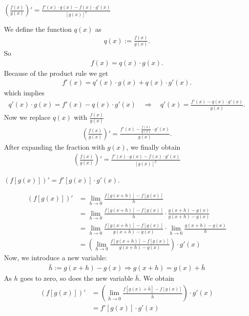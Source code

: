 \documentclass[12pt,eng]{skript_ogg}
\begin{document}
\begin{satz}$\left(\frac{f(x)}{g(x)}\right)'=\frac{f'(x)\cdot g(x)-f(x)\cdot g'(x)}{[g(x)]^2}$
\end{satz}
\begin{beweis}
We define the function $q(x)$ as
\begin{align*}
q(x):=\frac{f(x)}{g(x)}.
\end{align*}
So
\begin{align*}
f(x)=q(x)\cdot g(x).
\end{align*}
Because of the product rule we get
\begin{align*}
f'(x)=q'(x)\cdot g(x)+q(x)\cdot g'(x).
\end{align*}
which implies
\begin{align*}
q'(x)\cdot g(x)=f'(x)-q(x)\cdot g'(x)\quad\Rightarrow\quad q'(x)=\frac{f'(x)-q(x)\cdot g'(x)}{g(x)}.
\end{align*}
Now we replace $q(x)$ with $\frac{f(x)}{g(x)}$
\begin{align*}
\left(\frac{f(x)}{g(x)}\right)'=\frac{f'(x)-\frac{f(x)}{g(x)}\cdot g'(x)}{g(x)}.
\end{align*}
After expanding the fraction with $g(x)$, we finally obtain
\begin{align*}
\left(\frac{f(x)}{g(x)}\right)'=\frac{f'(x)\cdot g(x)-f(x)\cdot g'(x)}{[g(x)]^2}
\end{align*}
\end{beweis}

\begin{satz}$\left(f\left[g(x)\right]\right)'=f'\left[g(x)\right]\cdot g'(x)$.
\end{satz}
\begin{beweis}
\begin{align*}
\left(f\left[g(x)\right]\right)'&=\lim_{h\rightarrow
  0}\frac{f\left[g(x+h)\right]-f\left[g(x)\right]}{h} \\
&=\lim_{h\rightarrow
  0}\frac{f\left[g(x+h)\right]-f\left[g(x)\right]}{h}\cdot
\frac{g(x+h)-g(x)}{g(x+h)-g(x)} \\
&=\lim_{h\rightarrow
  0}\frac{f\left[g(x+h)\right]-f\left[g(x)\right]}{g(x+h)-g(x)}\cdot \lim_{h\rightarrow 0}\frac{g(x+h)-g(x)}{h} \\
&=\left(\lim_{h\rightarrow
  0}\frac{f\left[g(x+h)\right]-f\left[g(x)\right]}{g(x+h)-g(x)}\right)\cdot g'(x)
\end{align*}
Now, we introduce a new variable:
\begin{align*}
\bar{h}:=g(x+h)-g(x)\Rightarrow g(x+h)=g(x)+\bar{h}
\end{align*}
As $h$ goes to zero, so does the new variable $\bar{h}$. We obtain
\begin{align*}
\left(f\left[g(x)\right]\right)'&=\left(\lim_{\bar{h}\rightarrow
    0}\frac{f\left[g(x)+\bar{h}\right]-f\left[g(x)\right]}{\bar{h}}\right)\cdot g'(x) \\
&=f'\left[g(x)\right]\cdot g'(x)
\end{align*}
\end{beweis}
\end{document}
